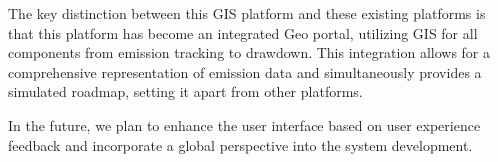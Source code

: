 The key distinction between this GIS platform and these existing platforms is that this platform has become an integrated Geo portal, utilizing GIS for all components from emission tracking to drawdown. This integration allows for a comprehensive representation of emission data and simultaneously provides a simulated roadmap, setting it apart from other platforms.\par
In the future, we plan to enhance the user interface based on user experience feedback and incorporate a global perspective into the system development.\par